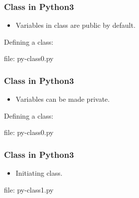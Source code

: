 \begin{frame}[fragile]
\frametitle{Class in Python3}
\begin{itemize}
\item Variables in class are public by default.
\end{itemize}
Defining a class:

file: py-class0.py
\end{frame}


\begin{frame}[fragile]
\frametitle{Class in Python3}
\begin{itemize}
\item Variables can be made private.
\end{itemize}
Defining a class:

file: py-class0.py
\end{frame}


\begin{frame}[fragile]
\frametitle{Class in Python3}
\begin{itemize}
\item Initiating class.
\end{itemize}

file: py-class1.py
\end{frame}

